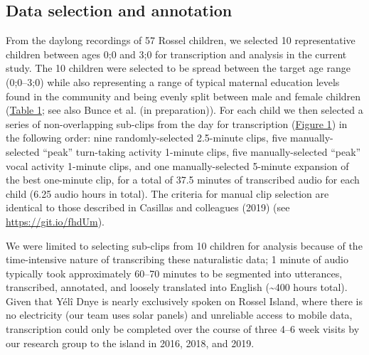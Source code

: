\documentclass[,man,mask,floatsintext]{apa6}
\begin{document}
\subsection{Data selection and annotation}\label{methods-samples}

From the daylong recordings of 57 Rossel children, we selected 10
representative children between ages 0;0 and 3;0 for transcription and
analysis in the current study. The 10 children were selected to be
spread between the target age range (0;0--3;0) while also representing a
range of typical maternal education levels found in the community and
being evenly split between male and female children
(\protect\hyperlink{tab1}{Table 1}; see also Bunce et al. (in
preparation)). For each child we then selected a series of
non-overlapping sub-clips from the day for transcription
(\protect\hyperlink{fig1}{Figure 1}) in the following order: nine
randomly-selected 2.5-minute clips, five manually-selected
\enquote{peak} turn-taking activity 1-minute clips, five
manually-selected \enquote{peak} vocal activity 1-minute clips, and one
manually-selected 5-minute expansion of the best one-minute clip, for a
total of 37.5 minutes of transcribed audio for each child (6.25 audio
hours in total). The criteria for manual clip selection are identical to
those described in Casillas and colleagues (2019) (see
\url{https://git.io/fhdUm}).

We were limited to selecting sub-clips from 10 children for analysis
because of the time-intensive nature of transcribing these naturalistic
data; 1 minute of audio typically took approximately 60--70 minutes to
be segmented into utterances, transcribed, annotated, and loosely
translated into English (\textasciitilde{}400 hours total). Given that
Yélî Dnye is nearly exclusively spoken on Rossel Island, where there is
no electricity (our team uses solar panels) and unreliable access to
mobile data, transcription could only be completed over the course of
three 4--6 week visits by our research group to the island in 2016,
2018, and 2019.
\end{document}
